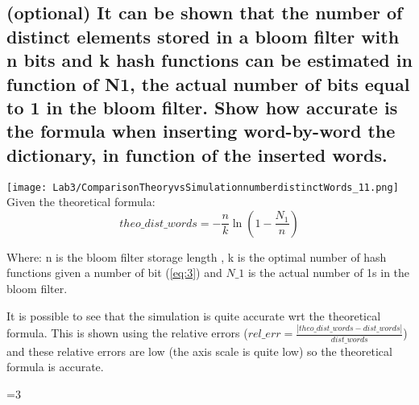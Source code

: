 \documentclass{report}
\newcounter{debug}
\begin{document}
{				\subsection{(optional) It can be shown that the number of distinct elements stored in a bloom filter
with n bits and k hash functions can be estimated in function of N1, the actual number of bits equal to 1 in the bloom filter. Show how accurate is the formula when inserting word-by-word the dictionary, in function of the inserted words.}
				\texttt{[image: Lab3/ComparisonTheoryvsSimulationnumberdistinctWords\_11.png]} \\
				Given the theoretical formula: 
				\[ theo\_dist\_words = - \frac{n}{k} \ln \left( 1 - \frac{N_1}{n} \right) \]
				\begin{center}
				Where: n is the bloom filter storage length , k is the optimal number of hash functions given a number of bit  (\ref{eq:3}) and $N\_1$ is the actual number of 1s in the bloom filter. 
				\end{center}
				It is possible to see that the simulation is quite accurate wrt the theoretical formula. This is shown using the relative errors ($ rel\_err=\frac{|theo\_dist\_words-dist\_words|}{dist\_words} $) and these relative errors are low (the axis scale is quite low) so the theoretical formula is accurate.
				
} \fi

\ifnum\value{debug}=3 {
} \fi
\end{document}
